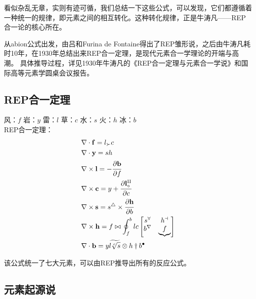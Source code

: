 \documentclass[12pt,a4paper]{article}%
\begin{document}
看似杂乱无章，实则有迹可循，我们总结一下这些公式，可以发现，它们都遵循着一种统一的规律，即元素之间的相互转化。这种转化规律，正是牛涛凡——REP合一论的核心所在。

从abion公式出发，由吕和Furina de Fontaine得出了REP雏形说，之后由牛涛凡耗时10年，在1930年总结出来REP合一定理，是现代元素合一学理论的开端与高潮。
具体推导过程，详见1930年牛涛凡的《REP合一定理与元素合一学说》和国际高等元素学圆桌会议报告。
\subsection{REP合一定理}
风：$f$
岩：$y$
雷：$l$
草：$c$
水：$s$
火：$h$
冰：$b$
\\
REP合一定理：
\begin{align}  
  &\nabla \cdot \mathbf{f} =l_{\succ } c\\  
  &\nabla \cdot \mathbf{y} = sh \\  
  &\nabla \times  \mathbf{l} = -\cfrac{\partial \mathbf{b}}{\partial f }  \\  
  &\nabla \times  \mathbf{c} = y +  \cfrac{\partial \mathbf{l_{\circ }^{\amalg } }}{\partial c}  \\ 
  &\nabla \times  \mathbf{s} = s^{\bigtriangleup }  \times \cfrac{\partial \mathbf{h}}{\partial b} \\
  &\nabla \times  \mathbf{h} = f\bowtie  \oint_{f}^{b}lc\begin{bmatrix}
 	s^{\forall } & h^{\dashv } \\
  b^{\nabla } &\underbrace{f} 
\end{bmatrix}  \\
&\nabla\cdot \mathbf{b} = y\widetilde{l\sqrt[c]{s} } \otimes h\dagger b^{\bullet } 
\end{align} 

该公式统一了七大元素，可以由REP推导出所有的反应公式。


\begin{center}
\section{元素起源说}
\end{center}
\end{document}
